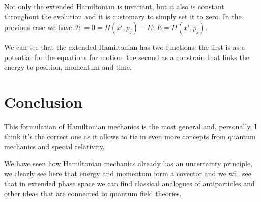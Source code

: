 \documentclass[aps,pra,10pt,floatfix,nofootinbib]{revtex4-1}
\theoremstyle{definition}
\begin{document}
Not only the extended Hamiltonian is invariant, but it also is constant throughout the evolution and it is customary to simply set it to zero. In the previous case we have $\mathcal{H} = 0 = H(x^i,p_j) - E$: $E = H(x^i,p_j)$.

We can see that the extended Hamiltonian has two functions: the first is as a potential for the equations for motion; the second as a constrain that links the energy to position, momentum and time.

\section{Conclusion}

This formulation of Hamiltonian mechanics is the most general and, personally, I think it's the correct one as it allows to tie in even more concepts from quantum mechanics and special relativity.

We have seen how Hamiltonian mechanics already has an uncertainty principle, we clearly see here that energy and momentum form a covector and we will see that in extended phase space we can find classical analogues of antiparticles and other ideas that are connected to quantum field theories.
\end{document}
